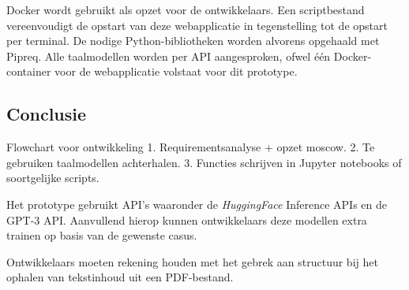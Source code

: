 Docker wordt gebruikt als opzet voor de ontwikkelaars. Een scriptbestand vereenvoudigt de opstart van deze webapplicatie in tegenstelling tot de opstart per terminal. De nodige Python-bibliotheken worden alvorens opgehaald met Pipreq. Alle taalmodellen worden per API aangesproken, ofwel één Docker-container voor de webapplicatie volstaat voor dit prototype.

\subsection{Conclusie}

Flowchart voor ontwikkeling
1. Requirementsanalyse + opzet moscow.
2. Te gebruiken taalmodellen achterhalen.
3. Functies schrijven in Jupyter notebooks of soortgelijke scripts.

Het prototype gebruikt API's waaronder de \textit{HuggingFace} Inference APIs en de GPT-3 API. Aanvullend hierop kunnen ontwikkelaars deze modellen extra trainen op basis van de gewenste casus. 

\medspace

Ontwikkelaars moeten rekening houden met het gebrek aan structuur bij het ophalen van tekstinhoud uit een PDF-bestand.